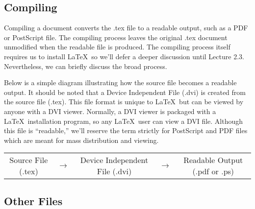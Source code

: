 \documentclass{article}
\begin{document}
\subsection{Compiling}

Compiling a document converts the .tex file to a readable output, such as a PDF or PostScript file. The compiling process leaves the original .tex document unmodified when the readable file is produced. The compiling process itself requires us to install \LaTeX\ so we'll defer a deeper discussion until Lecture 2.3. Nevertheless, we can briefly discuss the broad process.

Below is a simple diagram illustrating how the source file becomes a readable output. It should be noted that a Device Independent File (.dvi) is created from the source file (.tex). This file format is unique to \LaTeX\ but can be viewed by anyone with a DVI viewer. Normally, a DVI viewer is packaged with a \LaTeX\ installation program, so any \LaTeX\ user can view a DVI file. Although this file is ``readable,'' we'll reserve the term strictly for PostScript and PDF files which are meant for mass distribution and viewing.
\begin{center}
\begin{tabular}{c c c c c}
Source File (.tex) & $\rightarrow$ & Device Independent File (.dvi) & $\rightarrow$ & Readable Output (.pdf or .ps) \\
\end{tabular}
\end{center}

\subsection{Other Files}
\end{document}
